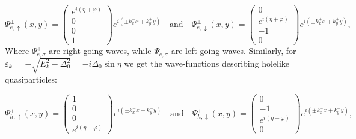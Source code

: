\begin{equation}
    \Psi^{\pm}_{e,\uparrow}(x,y) = 
    \begin{pmatrix}
        e^{i(\eta + \varphi)} \\ 0 \\ 0 \\ 1
    \end{pmatrix}e^{i(\pm k_x^{+}x + k_y^+y)}
    \quad \mathrm{and} \quad 
    \Psi^{\pm}_{e,\downarrow}(x,y) = 
    \begin{pmatrix}
        0 \\ e^{i(\eta+\varphi)} \\ -1 \\0
    \end{pmatrix}e^{i(\pm k_x^+x +k_y^+y)},
\end{equation}
Where $\Psi^+_{e,\sigma}$ are right-going waves, while $\Psi^-_{e,\sigma}$ are left-going waves. Similarly, for $\varepsilon^-_k = -\sqrt{E_k^2-\Delta_0^2} = -i\Delta_0\sin\eta$ we get the wave-functions describing holelike quasiparticles:
\begin{comment}
Similarly, the wave functions corresponding to the eigenvalue $-E_{k,S}$ give
\begin{equation}
\begin{pmatrix}
\big(\varepsilon_{k,S} + E_{k,S}\big) \hat{\sigma}_0 & i\Delta\hat{\sigma}_2 \\
-i\Delta^*\hat{\sigma}_2 & -\big(\varepsilon_{k,S} - E_{k,S}\big)\hat{\sigma_0}  
\end{pmatrix}
\sim
\begin{pmatrix}
\hat{\sigma}_0 & i\frac{v_0}{u_0}e^{i\gamma}\hat{\sigma}_2 \\
0 & 0
\end{pmatrix}
\end{equation}
which give the solutions
\end{comment}
\begin{equation}
    \Psi^{\pm}_{h,\uparrow}(x,y) = 
    \begin{pmatrix}
        1\\0\\0 \\ e^{i(\eta-\varphi)}
    \end{pmatrix}e^{i(\pm k_x^-x + k_y^-y)}
    \quad \mathrm{and} \quad 
    \Psi^{\pm}_{h,\downarrow}(x,y) = 
    \begin{pmatrix}
        0\\-1 \\e^{i(\eta-\varphi)}\\0
    \end{pmatrix}e^{i(\pm k_x^-x + k_y^-y)},
\end{equation}
